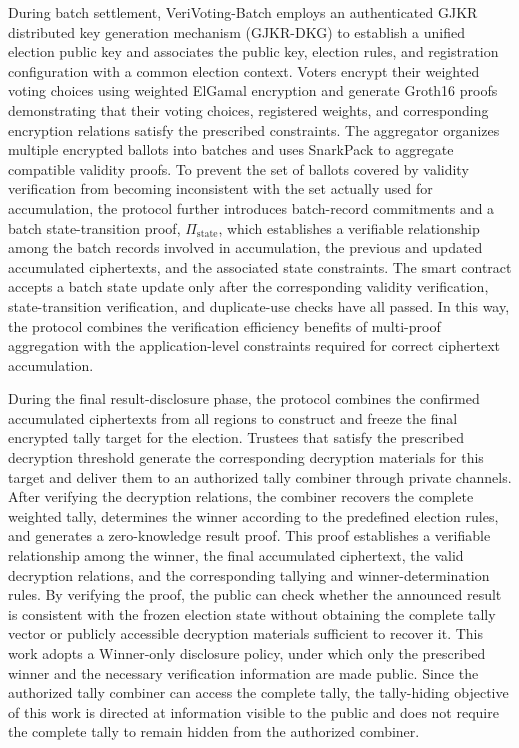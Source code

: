 \documentclass[pdflatex,sn-mathphys-num]{sn-jnl}%
\theoremstyle{thmstyleone}%
\theoremstyle{thmstyletwo}%
\theoremstyle{thmstylethree}%
\begin{document}
During batch settlement, VeriVoting-Batch employs an authenticated GJKR distributed key
generation mechanism (GJKR-DKG) to establish a unified election public key and
associates the public key, election rules, and registration configuration with a common
election context. Voters encrypt their weighted voting choices using weighted ElGamal
encryption and generate Groth16 proofs demonstrating that their voting choices,
registered weights, and corresponding encryption relations satisfy the prescribed
constraints. The aggregator organizes multiple encrypted ballots into batches and uses
SnarkPack to aggregate compatible validity proofs. To prevent the set of ballots covered
by validity verification from becoming inconsistent with the set actually used for
accumulation, the protocol further introduces batch-record commitments and a batch
state-transition proof, \(\Pi_{\mathrm{state}}\), which establishes a verifiable
relationship among the batch records involved in accumulation, the previous and updated
accumulated ciphertexts, and the associated state constraints. The smart contract
accepts a batch state update only after the corresponding validity verification,
state-transition verification, and duplicate-use checks have all passed. In this way,
the protocol combines the verification efficiency benefits of multi-proof aggregation
with the application-level constraints required for correct ciphertext accumulation.

During the final result-disclosure phase, the protocol combines the confirmed
accumulated ciphertexts from all regions to construct and freeze the final encrypted
tally target for the election. Trustees that satisfy the prescribed decryption threshold
generate the corresponding decryption materials for this target and deliver them to an
authorized tally combiner through private channels. After verifying the decryption
relations, the combiner recovers the complete weighted tally, determines the winner
according to the predefined election rules, and generates a zero-knowledge result proof.
This proof establishes a verifiable relationship among the winner, the final accumulated
ciphertext, the valid decryption relations, and the corresponding tallying and
winner-determination rules. By verifying the proof, the public can check whether the
announced result is consistent with the frozen election state without obtaining the
complete tally vector or publicly accessible decryption materials sufficient to recover
it. This work adopts a Winner-only disclosure policy, under which only the prescribed
winner and the necessary verification information are made public. Since the authorized
tally combiner can access the complete tally, the tally-hiding objective of this work is
directed at information visible to the public and does not require the complete tally to
remain hidden from the authorized combiner.
\end{document}
